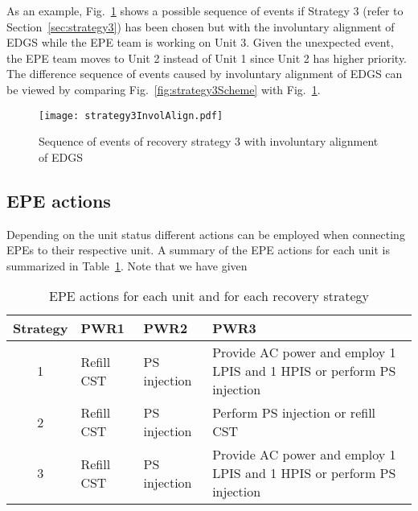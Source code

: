 As an example, Fig.~\ref{fig:strategy3SchemeInvolAlign} shows a possible sequence of events if Strategy 3 
(refer to Section~\ref{sec:strategy3}) has been chosen but with the involuntary alignment of EDGS while the EPE team
is working on Unit 3. Given the unexpected event, the EPE team moves to Unit 2 instead of Unit 1 since Unit 2
has higher priority. The difference sequence of events caused by involuntary alignment of EDGS can be viewed
by comparing Fig.~\ref{fig:strategy3Scheme} with Fig.~\ref{fig:strategy3SchemeInvolAlign}.

\begin{figure}
  \centering
  \centerline{\texttt{[image: strategy3InvolAlign.pdf]}}
  \caption{Sequence of events of recovery strategy 3 with involuntary alignment of EDGS}
  \label{fig:strategy3SchemeInvolAlign}
\end{figure}

\subsection{EPE actions}
\label{sec:EPEactions}

Depending on the unit status different actions can be employed when connecting EPEs to their respective unit.
A summary of the EPE actions for each unit is summarized in Table~\ref{tab:EPEactions}. Note that we have given 

\begin{table}
  \begin{tabular}{|c|l|l|p{5cm}|}
     \hline
       \textbf{Strategy} &  \textbf{PWR1}       &  \textbf{PWR2}         &  \textbf{PWR3}    \\ 
       \hline \hline                                                              
       1        & Refill CST & PS injection & Provide AC power and employ 1 LPIS and 1 HPIS or perform PS injection  \\ \hline
       2        & Refill CST & PS injection & Perform PS injection or refill CST                                     \\ \hline
       3        & Refill CST & PS injection & Provide AC power and employ 1 LPIS and 1 HPIS or perform PS injection  \\ \hline
  \end{tabular}
  \caption{EPE actions for each unit and for each recovery strategy}
  \label{tab:EPEactions}
\end{table} 

